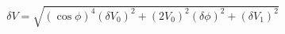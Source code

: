 \begin{equation}
\label{eq:delta_V_Malus}
\delta V = \sqrt{ \left(\cos{\phi}\right)^4(\delta V_0)^2 + \left(2V_0  \right)^2(\delta \phi)^2+ (\delta V_1)^2}
\end{equation}